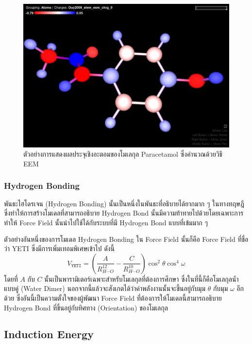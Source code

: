 \begin{figure}[H]
  \centering
  \includegraphics[width=0.7\linewidth]{fig/EEM-paracetamol.png}
  \caption{ตัวอย่างการแสดงผลประจุเชิงอะตอมของโมเลกุล Paracetamol ซึ่งคำนวณด้วยวิธี EEM}
  \label{fig:EEM_paracetamol}
\end{figure}

\subsubsection{Hydrogen Bonding}

พันธะไฮโดรเจน (Hydrogen Bonding) นั้นเป็นหนึ่งในพันธะที่อธิบายได้ยากมาก ๆ ในทางทฤษฎี ซึ่งทำให้การสร้างโมเดลที่สามารถอธิบาย Hydrogen Bond นั้นมีความท้าทายไปด้วยโดยเฉพาะการทำให้ Force Field นั้นนำไปใช้ได้กับระบบที่มี Hydrogen Bond แบบที่เข้มมาก ๆ

ตัวอย่างอันหนึ่งของการโมเดล Hydrogen Bonding ใน Force Field นั้นก็คือ Force Field ที่ชื่อว่า YETI\autocite{vedani1988} ซึ่งมีการเพิ่มเทอมพิเศษเข้าไป ดังนี้
%
\begin{equation}
  V_{\texttt{YETI}}
  =
  \left(
  \frac{A}{R^{12}_{H \cdots O}}
  - \frac{C}{R^{10}_{H \cdots O}}
  \right)
  \cos^{2} \theta
  \cos^{4} \omega
\end{equation}
%
โดยที่ $A$ กับ $C$ นั้นเป็นพารามิเตอร์เฉพาะสำหรับโมเลกุลที่ต้องการศึกษา ซึ่งในที่นี้ก็คือโมเลกุลน้ำแบบคู่ (Water Dimer) นอกจากนี้แล้วจะสังเกตได้ว่าค่าพลังงานนั้นจะขึ้นอยู่กับมุม $\theta$ กับมุม $\omega$ อีกด้วย ซึ่งอันนี้เป็นความตั้งใจของผู้พัฒนา Force Field ที่ต้องการให้โมเดลนี้สามารถอธิบาย Hydrogen Bond ที่ขึ้นอยู่กับทิศทาง (Orientation) ของโมเลกุล

\subsection{Induction Energy}


